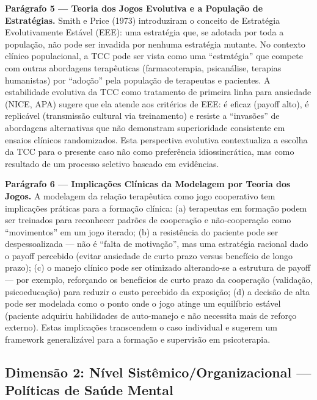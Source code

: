 \documentclass[12pt,a4paper]{article}
\begin{document}
\textbf{Parágrafo 5 — Teoria dos Jogos Evolutiva e a População de Estratégias.} Smith e Price (1973) introduziram o conceito de Estratégia Evolutivamente Estável (EEE): uma estratégia que, se adotada por toda a população, não pode ser invadida por nenhuma estratégia mutante. No contexto clínico populacional, a TCC pode ser vista como uma ``estratégia'' que compete com outras abordagens terapêuticas (farmacoterapia, psicanálise, terapias humanistas) por ``adoção'' pela população de terapeutas e pacientes. A estabilidade evolutiva da TCC como tratamento de primeira linha para ansiedade (NICE, APA) sugere que ela atende aos critérios de EEE: é eficaz (payoff alto), é replicável (transmissão cultural via treinamento) e resiste a ``invasões'' de abordagens alternativas que não demonstram superioridade consistente em ensaios clínicos randomizados. Esta perspectiva evolutiva contextualiza a escolha da TCC para o presente caso não como preferência idiossincrática, mas como resultado de um processo seletivo baseado em evidências.

\textbf{Parágrafo 6 — Implicações Clínicas da Modelagem por Teoria dos Jogos.} A modelagem da relação terapêutica como jogo cooperativo tem implicações práticas para a formação clínica: (a) terapeutas em formação podem ser treinados para reconhecer padrões de cooperação e não-cooperação como ``movimentos'' em um jogo iterado; (b) a resistência do paciente pode ser despessoalizada --- não é ``falta de motivação'', mas uma estratégia racional dado o payoff percebido (evitar ansiedade de curto prazo versus benefício de longo prazo); (c) o manejo clínico pode ser otimizado alterando-se a estrutura de payoff --- por exemplo, reforçando os benefícios de curto prazo da cooperação (validação, psicoeducação) para reduzir o custo percebido da exposição; (d) a decisão de alta pode ser modelada como o ponto onde o jogo atinge um equilíbrio estável (paciente adquiriu habilidades de auto-manejo e não necessita mais de reforço externo). Estas implicações transcendem o caso individual e sugerem um framework generalizável para a formação e supervisão em psicoterapia.

\subsection{Dimensão 2: Nível Sistêmico/Organizacional — Políticas de Saúde Mental}
\end{document}
